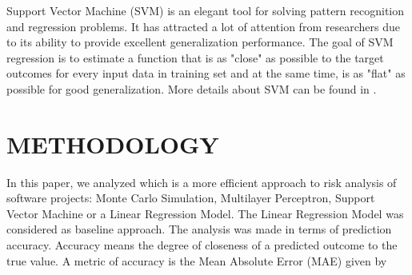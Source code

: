 \documentclass[a4paper,twoside]{article}
\begin{document}
\noindent Support Vector Machine (SVM) is an elegant tool for solving pattern recognition and regression problems. It has attracted a lot of attention from researchers due to its ability to provide excellent generalization performance. The goal of SVM regression is to estimate a function that is as "close" as possible to the target outcomes for every input data in training set and at the same time, is as "flat" as possible for good generalization. More details about SVM can be found in \cite{Shevade1999}.

\section{\uppercase{Methodology}}
\label{sec:methodology}

\noindent In this paper, we analyzed which is a more efficient approach to risk analysis of software projects: Monte Carlo Simulation, Multilayer Perceptron, Support Vector Machine or a Linear Regression Model. The Linear Regression Model was considered as baseline approach. The analysis was made in terms of prediction accuracy. Accuracy means the degree of closeness of a predicted outcome to the true value. A metric of accuracy is the Mean Absolute Error (MAE) given by
\end{document}
